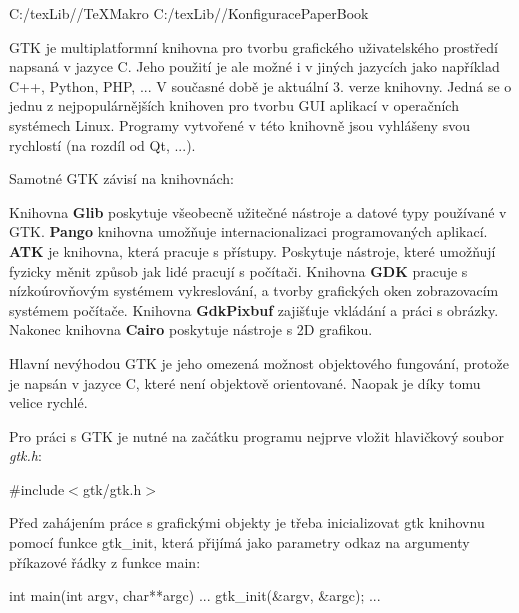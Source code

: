 \def\ddr{C:/texLib/}

 \ddr/TeXMakro
\setAddress{\ddr}
 \ddr/KonfiguracePaperBook






GTK je multiplatformní knihovna pro tvorbu grafického uživatelského prostředí napsaná v jazyce C. Jeho použití je ale možné i v jiných jazycích jako například C++, Python, PHP, ... V současné době je aktuální 3. verze knihovny. Jedná se o jednu z nejpopulárnějších knihoven pro tvorbu GUI aplikací v operačních systémech Linux. Programy vytvořené v této knihovně jsou vyhlášeny svou rychlostí (na rozdíl od Qt, ...).

Samotné GTK závisí na knihovnách:



Knihovna {\bf Glib} poskytuje všeobecně užitečné nástroje a datové typy používané v GTK. {\bf Pango} knihovna umožňuje internacionalizaci programovaných aplikací. {\bf ATK} je knihovna, která pracuje s přístupy. Poskytuje nástroje, které umožňují fyzicky měnit způsob jak lidé pracují s počítači. Knihovna {\bf GDK} pracuje s nízkoúrovňovým systémem vykreslování, a tvorby grafických oken zobrazovacím systémem počítače. Knihovna {\bf GdkPixbuf} zajišťuje vkládání a práci s obrázky. Nakonec knihovna {\bf Cairo} poskytuje nástroje s 2D grafikou.

Hlavní nevýhodou GTK je jeho omezená možnost objektového fungování, protože je napsán v jazyce C, které není objektově orientované. Naopak je díky tomu velice rychlé.


Pro práci s GTK je nutné na začátku programu nejprve vložit hlavičkový soubor {\it gtk.h}:

\vskip 4mm
{
\verbatim
\hskip 4mm \#include$<$gtk/gtk.h$>$
}
\vskip 4mm


Před zahájením práce s grafickými objekty je třeba inicializovat gtk knihovnu pomocí funkce gtk\_init, která přijímá jako parametry odkaz na argumenty příkazové řádky z funkce main:

\vskip 4mm
{
\verbatim
\odradkovat
\hskip 4mm int main(int argv, char**argc)\odradkovat
\hskip 4mm...\odradkovat
\hskip 4mm gtk\_init(\&argv, \&argc);\odradkovat
\hskip 4mm...\odradkovat
}
\vskip 4mm


